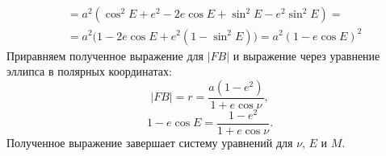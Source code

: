{\begin{align*}
		&= a^2 \left( \cos^2 E + e^2 - 2 e \cos E + \sin^2 E - e^2 \sin^2 E \right) = \\
		&= a^2 \Big( 1 - 2 e \cos E + e^2 \left( 1 - \sin^2 E \right) \Big) =  a^2 \left( 1 - e \cos E \right)^2
\end{align*}
Приравняем полученное выражение для $|FB|$ и выражение через уравнение эллипса в полярных координатах:
\begin{equation*}
	|FB| = r = \frac{a \left(1 - e^2 \right)}{ 1 + e \cos \nu},
\end{equation*}
\begin{equation*}
	 1 - e \cos E  = \frac{1 - e^2}{ 1 + e \cos \nu}.
\end{equation*}
 Полученное выражение завершает систему уравнений для $\nu$, $E$ и $M$.
}
